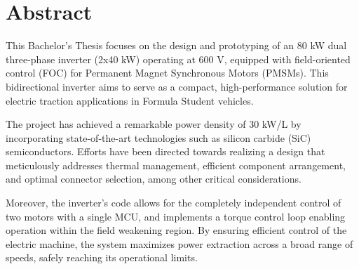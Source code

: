 \chapter*{Abstract}
This Bachelor's Thesis focuses on the design and prototyping of an 80 kW dual three-phase inverter (2x40 kW) operating at 600 V, equipped with field-oriented control (FOC) for Permanent Magnet Synchronous Motors (PMSMs). This bidirectional inverter aims to serve as a compact, high-performance solution for electric traction applications in Formula Student vehicles.

The project has achieved a remarkable power density of 30 kW/L by incorporating state-of-the-art technologies such as silicon carbide (SiC) semiconductors. Efforts have been directed towards realizing a design that meticulously addresses thermal management, efficient component arrangement, and optimal connector selection, among other critical considerations.

Moreover, the inverter's code allows for the completely independent control of two motors with a single MCU, and implements a torque control loop enabling operation within the field weakening region. By ensuring efficient control of the electric machine, the system maximizes power extraction across a broad range of speeds, safely reaching its operational limits.